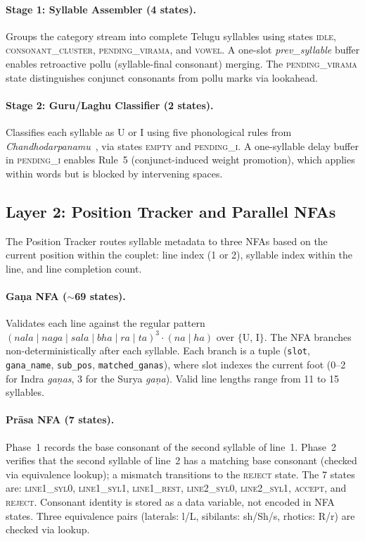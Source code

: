 \documentclass[11pt]{article}
\begin{document}
\paragraph{Stage 1: Syllable Assembler (4 states).}
Groups the category stream into complete Telugu syllables using states
\textsc{idle}, \textsc{consonant\_cluster}, \textsc{pending\_virama}, and
\textsc{vowel}. A one-slot \textit{prev\_syllable} buffer enables retroactive
pollu (syllable-final consonant) merging. The \textsc{pending\_virama} state
distinguishes conjunct consonants from pollu marks via lookahead.

\paragraph{Stage 2: Guru/Laghu Classifier (2 states).}
Classifies each syllable as U or I using five phonological rules from
\textit{Chandhodarpanamu}~\citep{chandhodarpanamu}, via states
\textsc{empty} and \textsc{pending\_i}. A one-syllable delay buffer in \textsc{pending\_i} enables Rule~5 (conjunct-induced weight promotion),
which applies within words but is blocked by intervening spaces.

\subsection{Layer 2: Position Tracker and Parallel NFAs}
\label{sec:nfas}

The Position Tracker routes syllable metadata to three NFAs based on the
current position within the couplet: line index (1 or 2), syllable index within the line, and line completion count.

\paragraph{Ga\d{n}a NFA ($\sim$69 states).}
Validates each line against the regular pattern
$(nala \mid naga \mid sala \mid bha \mid ra \mid ta)^3 \cdot (na \mid ha)$
over $\{$U, I$\}$. The NFA branches non-deterministically after each
syllable. Each branch is a tuple (\texttt{slot}, \texttt{gana\_name}, \texttt{sub\_pos}, \texttt{matched\_ganas}), where slot indexes the current foot (0--2 for Indra \textit{ga\d{n}as}, 3 for the Surya \textit{ga\d{n}a}). Valid line lengths range from 11 to 15 syllables.

\paragraph{Pr\={a}sa NFA (7 states).}
Phase~1 records the base consonant of the second syllable of
line~1. Phase~2 verifies that the second syllable of line~2 has a matching base consonant (checked via equivalence lookup); a mismatch transitions to the \textsc{reject} state. The 7 states are: \textsc{line1\_syl0}, \textsc{line1\_syl1}, \textsc{line1\_rest}, \textsc{line2\_syl0}, \textsc{line2\_syl1}, \textsc{accept}, and \textsc{reject}. Consonant identity is stored as a data variable, not encoded in NFA states. Three equivalence pairs (laterals: l/L, sibilants: sh/Sh/s, rhotics: R/r) are checked via lookup.
\end{document}
